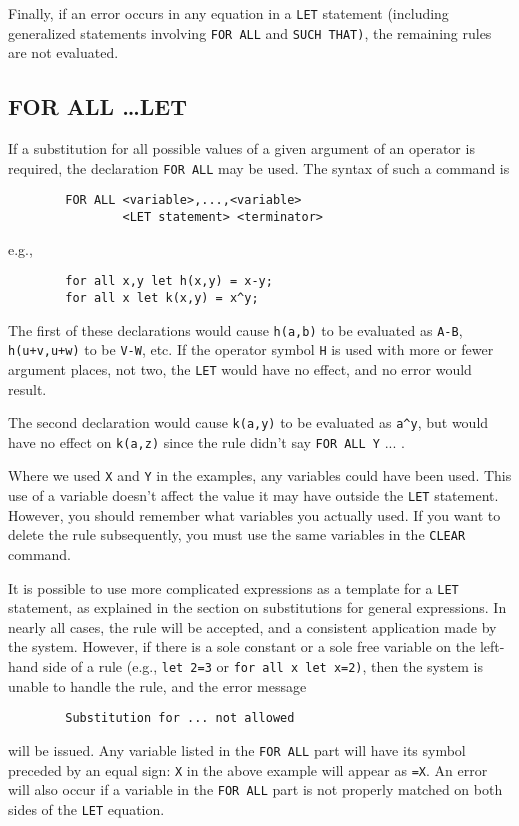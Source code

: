 Finally, if an error occurs in any equation in a {\tt LET} statement
(including generalized statements involving {\tt FOR ALL} and {\tt SUCH
THAT)}, the remaining rules are not evaluated.

\subsection{FOR ALL \ldots LET}
If a substitution for all possible values of a given argument of an
operator is required, the declaration {\tt FOR ALL} may be used. The
syntax of such a command is
\begin{verbatim}
        FOR ALL <variable>,...,<variable>
                <LET statement> <terminator>
\end{verbatim}
e.g.,
\begin{verbatim}
        for all x,y let h(x,y) = x-y;
        for all x let k(x,y) = x^y;
\end{verbatim}
The first of these declarations would cause {\tt h(a,b)} to be evaluated
as {\tt A-B}, {\tt h(u+v,u+w)} to be {\tt V-W}, etc.  If the operator
symbol {\tt H} is used with more or fewer argument places, not two, the
{\tt LET} would have no effect, and no error would result.

The second declaration would cause {\tt k(a,y)} to be evaluated as
{\tt a\verb|^|y}, but would have no effect on {\tt k(a,z)} since the rule
didn't say {\tt FOR ALL Y} ... .

Where we used {\tt X} and {\tt Y} in the examples, any variables could
have been used.  This use of a variable doesn't affect the value it may
have outside the {\tt LET} statement.  However, you should remember what
variables you actually used.  If you want to delete the rule subsequently,
you must use the same variables in the {\tt CLEAR} command.

It is possible to use more complicated expressions as a template for a
{\tt LET} statement, as explained in the section on substitutions for
general expressions.  In nearly all cases, the rule will be accepted, and
a consistent application made by the system.  However, if there is a sole
constant or a sole free variable on the left-hand side of a rule (e.g.,
{\tt let 2=3} or {\tt for all x let x=2)}, then the system is unable to
handle the rule, and the error message
\begin{verbatim}
        Substitution for ... not allowed
\end{verbatim}
will be issued.  Any variable listed in the {\tt FOR ALL} part will have
its symbol preceded by an equal sign: {\tt X} in the above example will
appear as {\tt =X}.  An error will also occur if a variable in the
{\tt FOR ALL} part is not properly matched on both sides of the {\tt LET}
equation.

